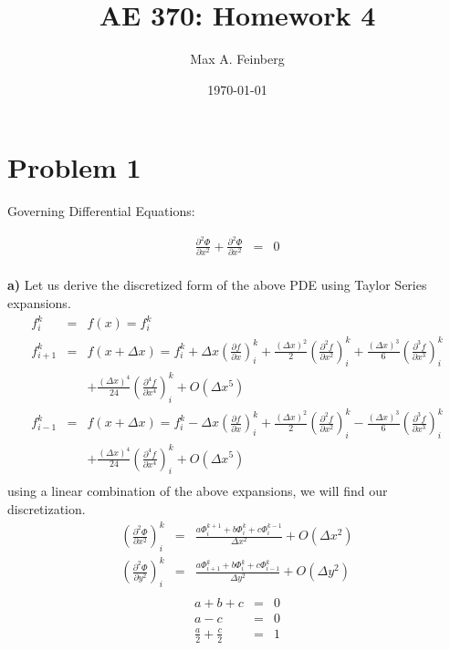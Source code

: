 \documentclass[a4paper]{article}
\title{AE 370: Homework 4}
\author{Max A. Feinberg}
\date{\AdvanceDate[-1]\today}
\begin{document}
\maketitle

\section*{Problem 1}
Governing Differential Equations:

\begin{eqnarray*}
\frac{\partial ^{2} \Phi}{\partial x^{2}} + \frac{\partial ^{2} \Phi}{\partial x^{2}} & = & 0\\
\end{eqnarray*}

\textbf{a)}
Let us derive the discretized form of the above PDE using Taylor Series expansions.
\begin{eqnarray*}
f^{k}_{i} & = & f(x)  = f^{k}_{i}\\
f^{k}_{i+1} & = & f(x + \Delta x)  = f^{k}_{i} +\Delta x (\frac{\partial f}{\partial x})^{k}_{i} + \frac{(\Delta x)^{2}}{2} (\frac{\partial^{2} f}{\partial x^{2}})^{k}_{i} + \frac{(\Delta x)^{3}}{6} (\frac{\partial^{3} f}{\partial x^{3}})^{k}_{i}\\
& & +\frac{(\Delta x)^{4}}{24} (\frac{\partial^{4} f}{\partial x^{4}})^{k}_{i} + O(\Delta x^{5})\\
f^{k}_{i-1} & = & f(x + \Delta x)  = f^{k}_{i}-\Delta x (\frac{\partial f}{\partial x})^{k}_{i} + \frac{(\Delta x)^{2}}{2} (\frac{\partial^{2} f}{\partial x^{2}})^{k}_{i} - \frac{(\Delta x)^{3}}{6} (\frac{\partial^{3} f}{\partial x^{3}})^{k}_{i}\\
& & +\frac{(\Delta x)^{4}}{24} (\frac{\partial^{4} f}{\partial x^{4}})^{k}_{i} + O(\Delta x^{5})\\
\end{eqnarray*}
using a linear combination of the above expansions, we will find our discretization.
\begin{eqnarray*}
(\frac{\partial ^{2} \Phi }{\partial x^{2}})^{k}_{i}& = & \frac{a \Phi^{k+1}_{i} + b \Phi^{k}_{i} + c \Phi^{k-1}_{i} }{\Delta x^{2}} + O(\Delta x^{2})\\
(\frac{\partial ^{2} \Phi }{\partial y^{2}})^{k}_{i}& = & \frac{a \Phi^{k}_{i+1} + b \Phi^{k}_{i} + c \Phi^{k}_{i-1} }{\Delta y^{2}} + O(\Delta y^{2})\\
\end{eqnarray*}
\begin{eqnarray*}
a + b + c & = & 0 \\
a - c & = & 0 \\
\frac{a}{2} + \frac{c}{2} & = & 1 \\
\end{eqnarray*}
\end{document}
